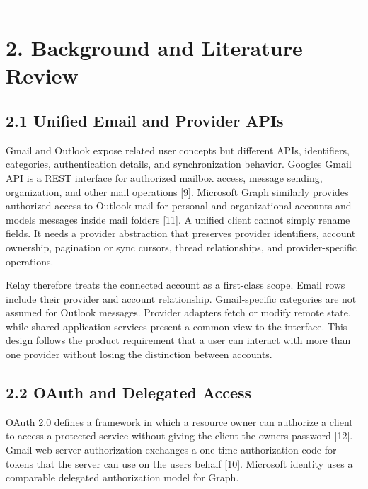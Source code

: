 \documentclass[
]{report}
\begin{document}
\begin{center}\rule{0.5\linewidth}{0.5pt}\end{center}

\chapter{2. Background and Literature
Review}\label{2-background-and-literature-review}

\section{2.1 Unified Email and Provider
APIs}\label{21-unified-email-and-provider-apis}

Gmail and Outlook expose related user concepts but different APIs,
identifiers, categories, authentication details, and synchronization
behavior. Google\textquotesingle s Gmail API is a REST interface for
authorized mailbox access, message sending, organization, and other mail
operations {[}9{]}. Microsoft Graph similarly provides authorized access
to Outlook mail for personal and organizational accounts and models
messages inside mail folders {[}11{]}. A unified client cannot simply
rename fields. It needs a provider abstraction that preserves provider
identifiers, account ownership, pagination or sync cursors, thread
relationships, and provider-specific operations.

Relay therefore treats the connected account as a first-class scope.
Email rows include their provider and account relationship.
Gmail-specific categories are not assumed for Outlook messages. Provider
adapters fetch or modify remote state, while shared application services
present a common view to the interface. This design follows the product
requirement that a user can interact with more than one provider without
losing the distinction between accounts.

\section{2.2 OAuth and Delegated
Access}\label{22-oauth-and-delegated-access}

OAuth 2.0 defines a framework in which a resource owner can authorize a
client to access a protected service without giving the client the
owner\textquotesingle s password {[}12{]}. Gmail web-server
authorization exchanges a one-time authorization code for tokens that
the server can use on the user\textquotesingle s behalf {[}10{]}.
Microsoft identity uses a comparable delegated authorization model for
Graph.
\end{document}
